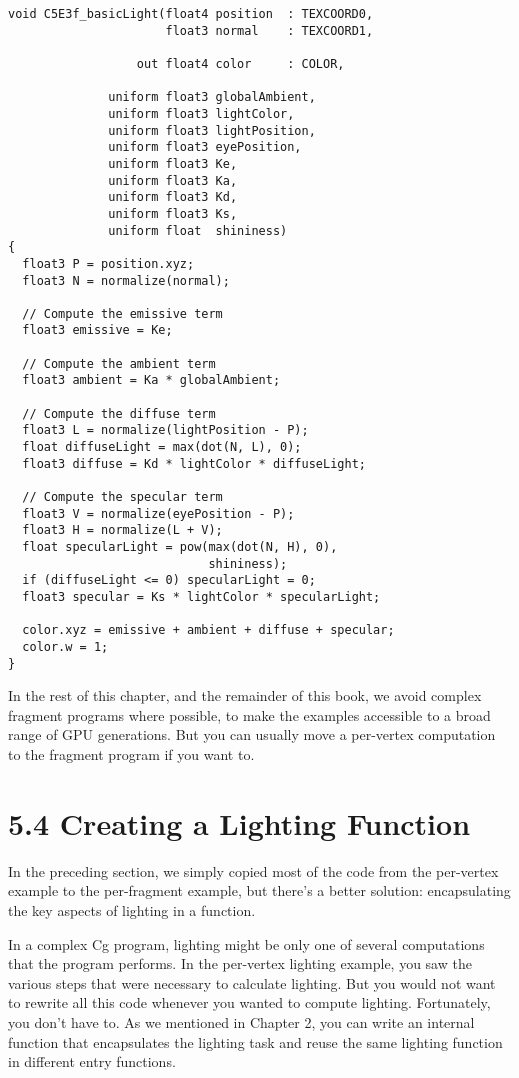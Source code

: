 \documentclass[../main.tex]{subfiles}
\begin{document}
\FloatBarrier
\begin{lstlisting}[caption=Example 5-3. The \textbf{C5E3f_basicLight} Fragment Program]
void C5E3f_basicLight(float4 position  : TEXCOORD0,
                      float3 normal    : TEXCOORD1,

                  out float4 color     : COLOR,

              uniform float3 globalAmbient,
              uniform float3 lightColor,
              uniform float3 lightPosition,
              uniform float3 eyePosition,
              uniform float3 Ke,
              uniform float3 Ka,
              uniform float3 Kd,
              uniform float3 Ks,
              uniform float  shininess)
{
  float3 P = position.xyz;
  float3 N = normalize(normal);

  // Compute the emissive term
  float3 emissive = Ke;

  // Compute the ambient term
  float3 ambient = Ka * globalAmbient;

  // Compute the diffuse term
  float3 L = normalize(lightPosition - P);
  float diffuseLight = max(dot(N, L), 0);
  float3 diffuse = Kd * lightColor * diffuseLight;

  // Compute the specular term
  float3 V = normalize(eyePosition - P);
  float3 H = normalize(L + V);
  float specularLight = pow(max(dot(N, H), 0),
                            shininess);
  if (diffuseLight <= 0) specularLight = 0;
  float3 specular = Ks * lightColor * specularLight;

  color.xyz = emissive + ambient + diffuse + specular;
  color.w = 1;
}
\end{lstlisting}
\FloatBarrier

In the rest of this chapter, and the remainder of this book, we avoid complex fragment programs where possible, to make the examples accessible to a broad range of GPU generations. But you can usually move a per-vertex computation to the fragment program if you want to.

\section{5.4 Creating a Lighting Function}

In the preceding section, we simply copied most of the code from the per-vertex example to the per-fragment example, but there's a better solution: encapsulating the key aspects of lighting in a function.

In a complex Cg program, lighting might be only one of several computations that the program performs. In the per-vertex lighting example, you saw the various steps that were necessary to calculate lighting. But you would not want to rewrite all this code whenever you wanted to compute lighting. Fortunately, you don't have to. As we mentioned in Chapter 2, you can write an internal function that encapsulates the lighting task and reuse the same lighting function in different entry functions.
\end{document}
